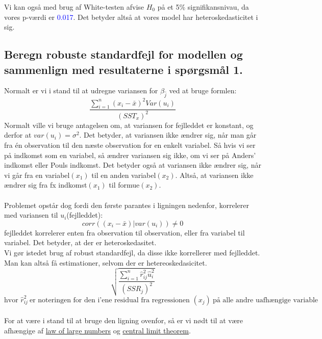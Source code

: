 \documentclass[
  10pt,
]{article}
\begin{document}
Vi kan også med brug af White-testen afvise \(H_0\) på et 5\%
signifikansnivau, da vores p-værdi er \textcolor{blue}{0.017}. Det
betyder altså at vores model har heteroskedasticitet i sig. \newpage

\hypertarget{beregn-robuste-standardfejl-for-modellen-og-sammenlign-med-resultaterne-i-spuxf8rgsmuxe5l-1.}{%
\subsection{Beregn robuste standardfejl for modellen og sammenlign med
resultaterne i spørgsmål
1.}\label{beregn-robuste-standardfejl-for-modellen-og-sammenlign-med-resultaterne-i-spuxf8rgsmuxe5l-1.}}

\leavevmode

Normalt er vi i stand til at udregne variansen for \(\beta_{\hat{j}}\)
ved at bruge formlen:
\[\frac{\sum\limits_{i=1}^{n}(x_i-\bar{x})^2Var(u_i)}{(SST_x)^2}\]
Normalt ville vi bruge antagelsen om, at variansen for fejlleddet er
konstant, og derfor at \(var(u_i)=\sigma^2\). Det betyder, at variansen
ikke ændrer sig, når man går fra én observation til den næste
observation for en enkelt variabel. Så hvis vi ser på indkomst som en
variabel, så ændrer variansen sig ikke, om vi ser på Anders' indkomst
eller Pouls indkomst. Det betyder også at variansen ikke ændrer sig, når
vi går fra en variabel\((x_1)\) til en anden variabel\((x_2)\). Altså,
at variansen ikke ændrer sig fra fx indkomst\((x_1)\) til
formue\((x_2)\).\\
~\\
Problemet opstår dog fordi den første parantes i ligningen nedenfor,
korrelerer med variansen til \(u_i\)(fejlleddet):
\[corr((x_i-\bar{x})|var(u_i))\neq0 \] fejlleddet korrelerer enten fra
observation til observation, eller fra variabel til variabel. Det
betyder, at der er heteroskedasitet.\\
\hspace*{0.333em}Vi gør istedet brug af robust standardfejl, da disse
ikke korrellerer med fejlleddet. Man kan altså få estimationer, selvom
der er hetereoskedasicitet.\\
\[\sqrt{\frac{\sum\limits_{i=1}^{n}\hat{r}_{ij}^2\hat{u}_i^2}{(SSR_j)^2}} \]
\[\text{hvor }\hat{r}_{ij}^2\ \text{er noteringen for den i’ene residual fra regressionen $(x_j)$}\ \text{på alle andre uafhængige variable }\]\\
For at være i stand til at bruge den ligning ovenfor, så er vi nødt til
at være afhængige af \hyperref[sec:lawoflarge]{law of large numbers} og
\hyperref[sec:CLT]{central limit theorem}.
\end{document}
